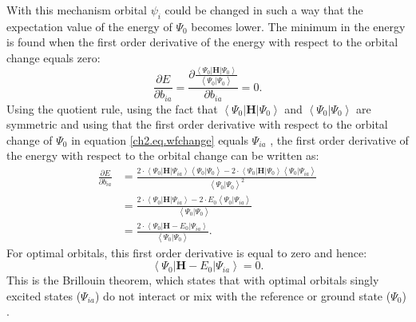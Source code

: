 With this mechanism orbital $\psi_i$ could be changed in such a way that the expectation value of the energy of $\Psi_0$ becomes lower. The minimum in the energy is found when the first order derivative of the energy with respect to the orbital change equals zero:
\begin{equation}
\frac{\partial E}{\partial b_{ia}}=\frac{\partial \frac{\left < \Psi_0 | \mathbf{H} | \Psi_0 \right >}{\left < \Psi_0 | \Psi_0 \right >}}{\partial b_{ia}}=0.
\label{ch2.eq.foderiv}
\end{equation}
Using the quotient rule, using the fact that $\left < \Psi_0 | \mathbf{H} | \Psi_0 \right >$ and $\left < \Psi_0 | \Psi_0 \right >$ are symmetric and using that the first order derivative with respect to the orbital change of $\Psi_0$ in equation \ref{ch2.eq.wfchange} equals $\Psi_{ia}$ \cite{vbscf2}, the first order derivative of the energy with respect to the orbital change can be written as: 
\begin{equation}
\begin{split}
\frac{\partial E}{\partial b_{ia}} & = \frac{2 \cdot \left < \Psi_0 | \mathbf{H} | \Psi_{ia} \right > \left< \Psi_0 | \Psi_0 \right > - 2 \cdot \left < \Psi_0 | \mathbf{H} | \Psi_0  \right > \left< \Psi_0 | \Psi_{ia}\right>}{\left < \Psi_0 | \Psi_0 \right > ^2 }\\
& = \frac{ 2 \cdot \left < \Psi_0 | \mathbf{H} | \Psi_{ia} \right > - 2 \cdot E_0 \left< \Psi_0 | \Psi_{ia} \right >}{\left < \Psi_0 | \Psi_0 \right >}\\
& = \frac{ 2 \cdot \left < \Psi_0 | \mathbf{H} - E_0 | \Psi_{ia} \right >}{\left < \Psi_0 | \Psi_0 \right >}.
\end{split}
\label{ch2.eq.foderiv2}
\end{equation}
For optimal orbitals, this first order derivative is equal to zero and hence:
\begin{equation}
\left < \Psi_0 | \mathbf{H} - E_0 | \Psi_{ia} \right > = 0.
\label{ch2.eq.brillouin}
\end{equation}
This is the Brillouin theorem, which states that with optimal orbitals singly excited states ($\Psi_{ia}$) do not interact or mix with the reference or ground state ($\Psi_0$) \cite{brillouin,genbrill}. 

